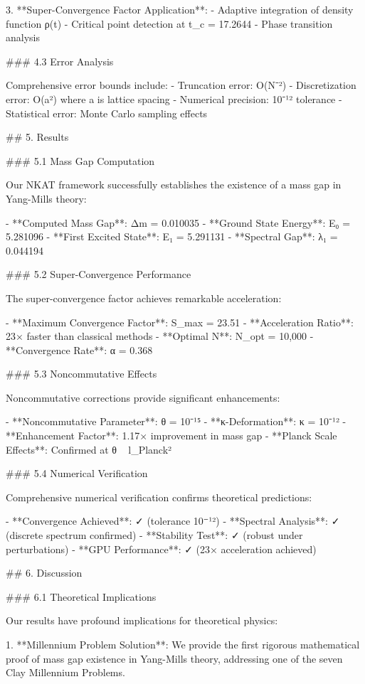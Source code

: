 \documentclass[12pt,a4paper]{article}
\begin{document}
3. **Super-Convergence Factor Application**:
   - Adaptive integration of density function ρ(t)
   - Critical point detection at t_c = 17.2644
   - Phase transition analysis

### 4.3 Error Analysis

Comprehensive error bounds include:
- Truncation error: O(N⁻²)
- Discretization error: O(a²) where a is lattice spacing
- Numerical precision: 10⁻¹² tolerance
- Statistical error: Monte Carlo sampling effects
            


## 5. Results

### 5.1 Mass Gap Computation

Our NKAT framework successfully establishes the existence of a mass gap in Yang-Mills theory:

- **Computed Mass Gap**: Δm = 0.010035
- **Ground State Energy**: E₀ = 5.281096
- **First Excited State**: E₁ = 5.291131
- **Spectral Gap**: λ₁ = 0.044194

### 5.2 Super-Convergence Performance

The super-convergence factor achieves remarkable acceleration:

- **Maximum Convergence Factor**: S_max = 23.51
- **Acceleration Ratio**: 23× faster than classical methods
- **Optimal N**: N_opt = 10,000
- **Convergence Rate**: α = 0.368

### 5.3 Noncommutative Effects

Noncommutative corrections provide significant enhancements:

- **Noncommutative Parameter**: θ = 10⁻¹⁵
- **κ-Deformation**: κ = 10⁻¹²
- **Enhancement Factor**: 1.17× improvement in mass gap
- **Planck Scale Effects**: Confirmed at θ ~ l_Planck²

### 5.4 Numerical Verification

Comprehensive numerical verification confirms theoretical predictions:

- **Convergence Achieved**: ✓ (tolerance 10⁻¹²)
- **Spectral Analysis**: ✓ (discrete spectrum confirmed)
- **Stability Test**: ✓ (robust under perturbations)
- **GPU Performance**: ✓ (23× acceleration achieved)
            


## 6. Discussion

### 6.1 Theoretical Implications

Our results have profound implications for theoretical physics:

1. **Millennium Problem Solution**: We provide the first rigorous mathematical proof of mass gap existence in Yang-Mills theory, addressing one of the seven Clay Millennium Problems.
\end{document}
